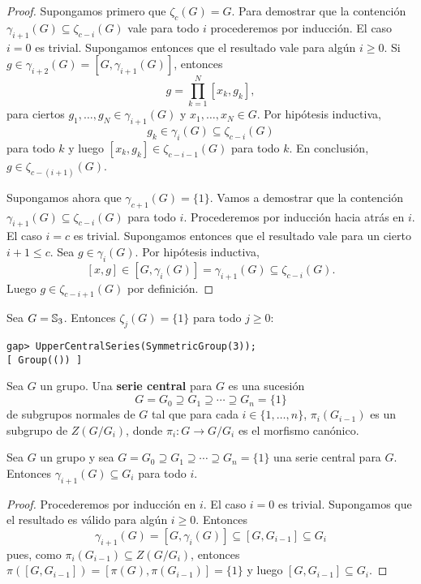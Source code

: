 \begin{proof}
    Supongamos primero que $\zeta_c(G)=G$. Para demostrar que la contención  
    $\gamma_{i+1}(G)\subseteq\zeta_{c-i}(G)$ vale para todo $i$
    procederemos por inducción. El caso $i=0$ es trivial. Supongamos 
    entonces que el resultado vale para algún $i\geq0$. Si
	$g\in\gamma_{i+2}(G)=[G,\gamma_{i+1}(G)]$, entonces    
	\[
	g=\prod_{k=1}^N [x_k,g_k],
	\]
    para ciertos $g_1,\dots,g_N\in\gamma_{i+1}(G)$ y $x_1,\dots,x_N\in G$. Por hipótesis inductiva, 
	\[
	g_k\in\gamma_i(G)\subseteq\zeta_{c-i}(G)
	\]
	para todo $k$ y luego $[x_k,g_k]\in\zeta_{c-i-1}(G)$ para todo $k$. En conclusión,  
	$g\in\zeta_{c-(i+1)}(G)$. 
	
	Supongamos ahora que $\gamma_{c+1}(G)=\{1\}$. Vamos a demostrar que la contención 
	$\gamma_{i+1}(G)\subseteq\zeta_{c-i}(G)$ para todo $i$. Procederemos por inducción hacia atrás 
	en $i$. 
	El caso $i=c$ es trivial. Supongamos entonces que el resultado
	vale para un cierto $i+1\leq c$. Sea $g\in\gamma_{i}(G)$. Por hipótesis inductiva, 
	\[
	[x,g]\in [G,\gamma_i(G)]=\gamma_{i+1}(G)\subseteq\zeta_{c-i}(G).
	\]
	Luego $g\in\zeta_{c-i+1}(G)$ por definición. 
\end{proof}

\begin{example}
	Sea $G=\mathbb{S}_3$. Entonces $\zeta_j(G)=\{1\}$ para todo $j\geq 0$: 
	\begin{lstlisting}
gap> UpperCentralSeries(SymmetricGroup(3));
[ Group(()) ]
	\end{lstlisting}
\end{example}

\begin{definition}
	Sea $G$ un grupo. Una \textbf{serie central} para $G$ es una sucesión 
	\[
		G=G_0\supseteq G_1\supseteq\cdots\supseteq G_n=\{1\}
	\]
	de subgrupos normales de $G$ tal que para cada $i\in\{1,\dots,n\}$, 
	$\pi_i(G_{i-1})$ es un subgrupo de $Z(G/G_i)$, donde $\pi_i\colon G\to
	G/G_i$ es el morfismo canónico.
\end{definition}

\begin{lemma}
	\label{lemma:serie_central}
	Sea $G$ un grupo y sea $G=G_0\supseteq G_1\supseteq\cdots\supseteq G_n=\{1\}$
	una serie central para $G$. Entonces $\gamma_{i+1}(G)\subseteq G_i$ para
	todo $i$.
\end{lemma}

\begin{proof}
	Procederemos por inducción en $i$. El caso $i=0$ es trivial.  Supongamos
	que el resultado es válido para algún $i\geq0$. Entonces 
	\[
	\gamma_{i+1}(G)=[G,\gamma_i(G)]\subseteq [G,G_{i-1}]\subseteq G_i
	\]
	pues, como $\pi_i(G_{i-1})\subseteq Z(G/G_{i})$, entonces
	$\pi([G,G_{i-1}])=[\pi(G),\pi(G_{i-1})]=\{1\}$ y luego $[G,G_{i-1}]\subseteq
	G_i$.
\end{proof}

